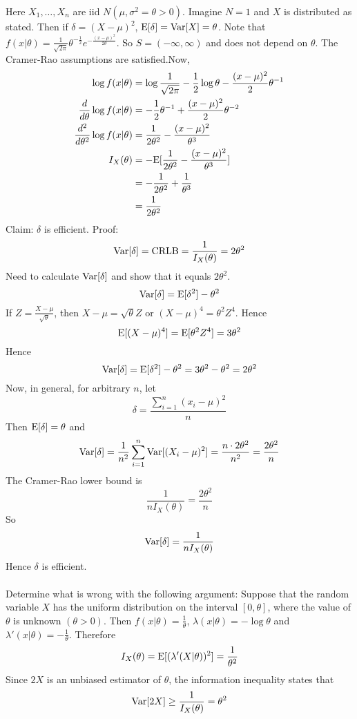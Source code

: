 \documentclass[12pt]{article}
\begin{document}
Here $X_1,\dots,X_n$ are iid $N(\mu, \sigma^2 = \theta > 0)$. Imagine $N = 1$ and $X$ is distributed as stated. Then if $\delta = (X - \mu)^2$, $\mathrm{E}[ \delta ] = \mathrm{Var}[ X ] = \theta$. Note that $f(x | \theta) = \frac{1}{\sqrt{2\pi}} \theta^{-\frac{1}{2}} e^{-\frac{(x-\mu)^2}{2\theta}}$. So $S = (-\infty,\infty)$ and does not depend on $\theta$. The Cramer-Rao assumptions are satisfied.Now, $$ \begin{aligned} \log f(x | \theta) &= \log \frac{1}{\sqrt{2\pi}} - \frac{1}{2}\log \theta - \frac{(x-\mu)^2}{2}\theta^{-1} \\ \frac{d}{d\theta} \log f(x | \theta) &= -\frac{1}{2}\theta^{-1} + \frac{(x-\mu)^2}{2} \theta^{-2} \\ \frac{d^2}{d\theta^2} \log f(x | \theta) &= \frac{1}{2\theta^2} - \frac{(x-\mu)^2}{\theta^3} \\ I_X(\theta) &= -\mathrm{E}[ \frac{1}{2\theta^2} - \frac{(x-\mu)^2}{\theta^3} ] \\ &= -\frac{1}{2\theta^2} + \frac{1}{\theta^3} \\ &= \frac{1}{2\theta^2} \end{aligned} $$ Claim: $\delta$ is efficient. Proof: $$ \mathrm{Var}[ \delta ] = \text{CRLB} = \frac{1}{I_X(\theta)} = 2\theta^2$$ Need to calculate $\mathrm{Var}[ \delta ]$ and show that it equals $2\theta^2$. $$ \mathrm{Var}[ \delta ] = \mathrm{E}[ \delta^2 ] - \theta^2$$ If $Z = \frac{X-\mu}{\sqrt{\theta}}$, then $X-\mu = \sqrt{\theta}Z$ or $(X-\mu)^4 = \theta^2Z^4$. Hence $$ \mathrm{E}[ (X-\mu)^4 ] = \mathrm{E}[ \theta^2Z^4 ] = 3\theta^2$$ Hence $$ \mathrm{Var}[ \delta ] = \mathrm{E}[ \delta^2 ] - \theta^2 = 3\theta^2 - \theta^2 = 2\theta^2 $$ 
Now, in general, for arbitrary $n$, let $$\delta = \frac{\sum_{i=1}^n (x_i - \mu)^2}{n}$$ Then $\mathrm{E}[ \delta ] = \theta$ and $$\mathrm{Var}[ \delta ] = \frac{1}{n^2}\sum_{i=1}^n \mathrm{Var}[ (X_i - \mu)^2 ] = \frac{n \cdot 2\theta^2}{n^2} = \frac{2\theta^2}{n} $$ The Cramer-Rao lower bound is $$ \frac{1}{nI_X(\theta)} = \frac{2\theta^2}{n} $$ So $$ \mathrm{Var}[ \delta ] = \frac{1}{nI_X(\theta)} $$ Hence $\delta$ is efficient. \\~\\
Determine what is wrong with the following argument: Suppose that the random variable $X$ has the uniform distribution on the interval $[0,\theta]$, where the value of $\theta$ is unknown $(\theta > 0)$. Then $f(x | \theta) = \frac{1}{\theta}$, $\lambda(x | \theta) = -\log \theta$ and $\lambda'(x | \theta) = -\frac{1}{\theta}$. Therefore $$ I_X(\theta) = \mathrm{E}[ (\lambda'(X|\theta))^2 ] = \frac{1}{\theta^2}  $$ 
Since $2X$ is an unbiased estimator of $\theta$, the information inequality states that $$ \mathrm{Var}[ 2X ] \geq \frac{1}{I_X(\theta)} = \theta^2$$ 
\end{document}
